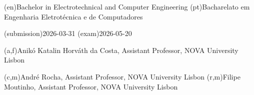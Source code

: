 \ntauthordegree(en){Bachelor in Electrotechnical and Computer Engineering}
\ntauthordegree(pt){Bacharelato em Engenharia Eletrotécnica e de Computadores}



\ntdate(submission){2026-03-31}
\ntdate(exam){2026-05-20}



(a,f){Anikó Katalin Horváth da Costa, Assistant Professor, NOVA University Lisbon}



(c,m){André Rocha, Assistant Professor, NOVA University Lisbon}
(r,m){Filipe Moutinho, Assistant Professor, NOVA University Lisbon}
